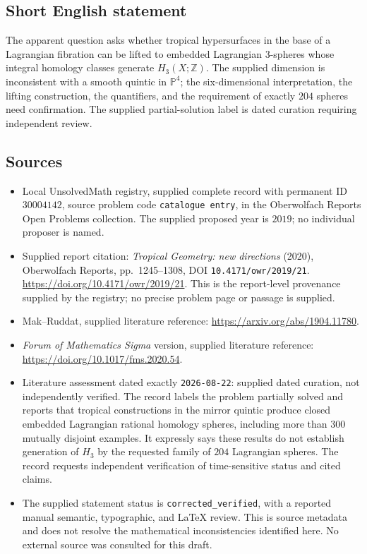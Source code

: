 \documentclass[11pt]{article}
\newcommand{\Z}{\mathbb{Z}}
\begin{document}
\subsection{Short English statement}
The apparent question asks whether tropical hypersurfaces in the base of a Lagrangian fibration can be lifted to embedded Lagrangian \(3\)-spheres whose integral homology classes generate \(H_3(X;\Z)\). The supplied dimension is inconsistent with a smooth quintic in \(\mathbb P^4\); the six-dimensional interpretation, the lifting construction, the quantifiers, and the requirement of exactly \(204\) spheres need confirmation. The supplied partial-solution label is dated curation requiring independent review.
\subsection{Sources}
\begin{itemize}
\item Local UnsolvedMath registry, supplied complete record with permanent ID \(30004142\), source problem code \texttt{catalogue entry}, in the Oberwolfach Reports Open Problems collection. The supplied proposed year is \(2019\); no individual proposer is named.
\item Supplied report citation: \emph{Tropical Geometry: new directions} (2020), Oberwolfach Reports, pp.\ 1245--1308, DOI \texttt{10.4171/owr/2019/21}. \url{https://doi.org/10.4171/owr/2019/21}. This is the report-level provenance supplied by the registry; no precise problem page or passage is supplied.
\item Mak--Ruddat, supplied literature reference: \url{https://arxiv.org/abs/1904.11780}.
\item \emph{Forum of Mathematics Sigma} version, supplied literature reference: \url{https://doi.org/10.1017/fms.2020.54}.
\item Literature assessment dated exactly \texttt{2026-08-22}: supplied dated curation, not independently verified. The record labels the problem partially solved and reports that tropical constructions in the mirror quintic produce closed embedded Lagrangian rational homology spheres, including more than \(300\) mutually disjoint examples. It expressly says these results do not establish generation of \(H_3\) by the requested family of \(204\) Lagrangian spheres. The record requests independent verification of time-sensitive status and cited claims.
\item The supplied statement status is \texttt{corrected\_verified}, with a reported manual semantic, typographic, and LaTeX review. This is source metadata and does not resolve the mathematical inconsistencies identified here. No external source was consulted for this draft.
\end{itemize}
\end{document}
